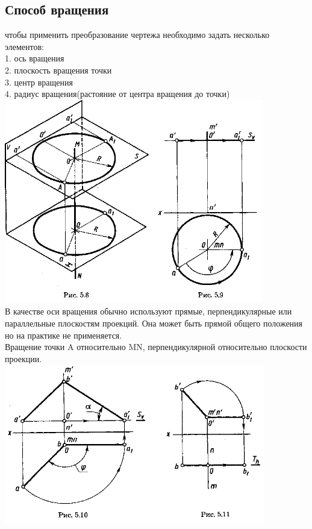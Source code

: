 \documentclass[a4paper, 12pt]{article}
\begin{document}
\subsection{Способ вращения}

чтобы применить преобразование чертежа необходимо задать  несколько элементов:\\
1. ось вращения\\
2. плоскость вращения точки\\
3. центр вращения\\
4. радиус вращения(растояние от центра вращения до точки)\\
\includegraphics{img/531.png}\\

В качестве оси вращения обычно используют прямые, перпендикулярные или параллельные плоскостям проекций. Она может быть прямой общего положения но на практике не применяется.\\

Вращение точки A относительно MN, перпендикулярной относительно плоскости проекции.\\
\includegraphics{img/532.png}\\
\end{document}
